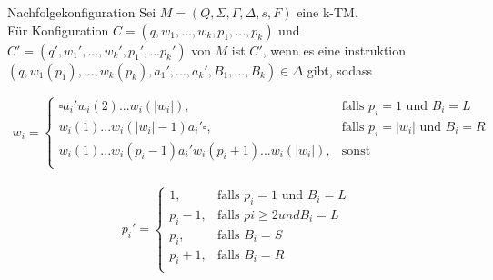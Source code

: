 \begin{defn}{Nachfolgekonfiguration}
    Sei $M = (Q, \Sigma, \Gamma, \Delta, s, F)$ eine k-TM. \\

    Für Konfiguration $C=(q,w_1,...,w_k,p_1,...,p_k)$ und $C' = (q', w_1',...,w_k',p_1',...p_k')$ von $M$ ist $C'$, 
    wenn es eine instruktion $(q, w_1(p_1),...,w_k(p_k),a_1',...,a_k',B_1,...,B_k) \in \Delta$ gibt, sodass

    \begin{align*}  
        w_i =
        \begin{cases} 
            \square a_i' w_i(2) ... w_i(| w_i |), & \text{falls }p_i = 1 \text{ und }  B_i = L \\ 
            w_i(1) ... w_i(|w_i| -1) a_i' \square, & \text{falls }p_i = |w_i| \text{ und } B_i = R\\ 
            w_i(1)...w_i(p_i -1) a_i' w_i(p_i +1)...w_i(| w_i |), &\text{sonst} \\
        \end{cases}
    \end{align*}

    \begin{align*}  
        p_i' =
        \begin{cases} 
            1, & \text{falls } p_i = 1  \text{ und } B_i = L \\ 
            p_i -1, & \text{falls } pi \geq 2 und B_i = L \\
            p_i, & \text{falls } B_i = S \\
            p_i + 1, & \text{falls } B_i = R \\
        \end{cases}
    \end{align*}
\end{defn}